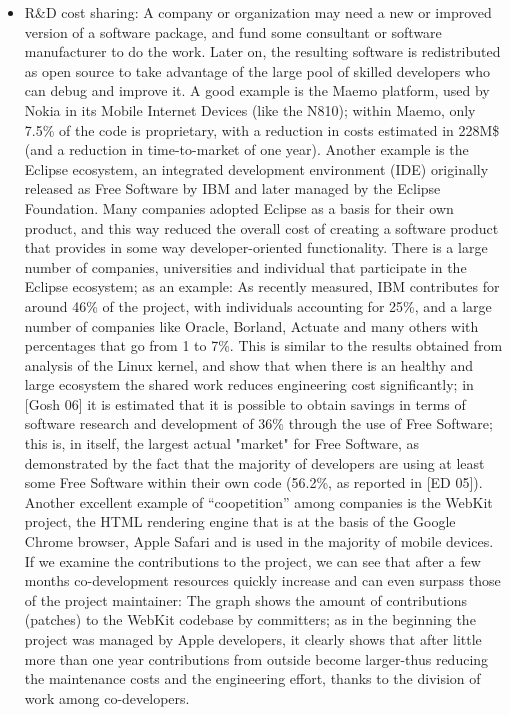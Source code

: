 \begin{itemize}
 \item R\&D cost sharing: A company or organization may need a new or improved version of a software package, and fund some consultant or software manufacturer to do the work. Later on, the resulting software is redistributed as open source to take advantage of the large pool of skilled developers who can debug and improve it. A good example is the Maemo platform, used by Nokia in its Mobile Internet Devices (like the N810); within Maemo, only 7.5\% of the code is proprietary, with a reduction in costs estimated in 228M\$ (and a reduction in time-to-market of one year). Another example is the Eclipse ecosystem, an integrated development environment (IDE) originally released as Free Software by IBM and later managed by the Eclipse Foundation. Many companies adopted Eclipse as a basis for their own product, and this way reduced the overall cost of creating a software product that provides in some way developer-oriented functionality. There is a large number of companies, universities and individual that participate in the Eclipse ecosystem; as an example: As recently measured, IBM contributes for around 46\% of the project, with individuals accounting for 25\%, and a large number of companies like Oracle, Borland, Actuate and many others with percentages that go from 1 to 7\%. This is similar to the results obtained from analysis of the Linux kernel, and show that when there is an healthy and large ecosystem the shared work reduces engineering cost significantly; in [Gosh 06] it is estimated that it is possible to obtain savings in terms of software research and development of 36\% through the use of Free Software; this is, in itself, the largest actual "market" for Free Software, as demonstrated by the fact that the majority of developers are using at least some Free Software within their own code (56.2\%, as reported in [ED 05]). Another excellent example of “coopetition” among companies is the WebKit project, the HTML rendering engine that is at the basis of the Google Chrome browser, Apple Safari and is used in the majority of mobile devices. If we examine the contributions to the project, we can see that after a few months co-development resources quickly increase and can even surpass those of the project maintainer:  The graph shows the amount of contributions (patches) to the WebKit codebase by committers; as in the beginning the project was managed by Apple developers, it clearly shows that after little more than one year contributions from outside become larger-thus reducing the maintenance costs and the engineering effort, thanks to the division of work among co-developers.

\end{itemize}
